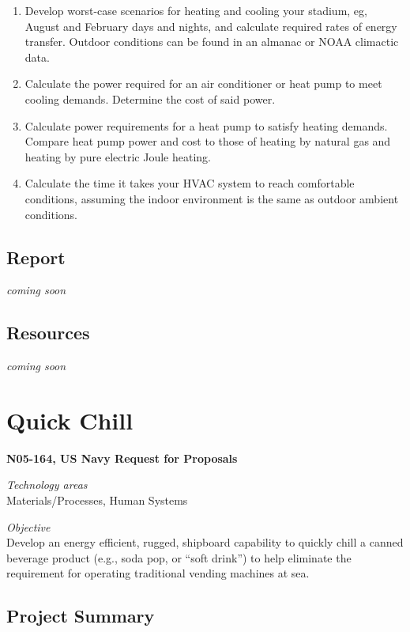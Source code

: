 \documentclass[]{tufte-book}
\providecommand{\tightlist}{%
  \setlength{\itemsep}{0pt}\setlength{\parskip}{0pt}}
\begin{document}
\begin{enumerate}
\def\labelenumi{\arabic{enumi}.}
\tightlist
\item
  Develop worst-case scenarios for heating and cooling your stadium, eg, August and February days and nights, and calculate required rates of energy transfer. Outdoor conditions can be found in an almanac or NOAA climactic data.
\item
  Calculate the power required for an air conditioner or heat pump to meet cooling demands. Determine the cost of said power.
\item
  Calculate power requirements for a heat pump to satisfy heating demands. Compare heat pump power and cost to those of heating by natural gas and heating by pure electric Joule heating.
\item
  Calculate the time it takes your HVAC system to reach comfortable conditions, assuming the indoor environment is the same as outdoor ambient conditions.
\end{enumerate}

\hypertarget{report}{%
\section{Report}\label{report}}

\emph{coming soon}

\hypertarget{resources}{%
\section{Resources}\label{resources}}

\emph{coming soon}

\hypertarget{quick-chill}{%
\chapter{Quick Chill}\label{quick-chill}}

\textbf{N05-164, US Navy Request for Proposals}

\emph{Technology areas}\\
Materials/Processes, Human Systems

\emph{Objective}\\
Develop an energy efficient, rugged, shipboard capability to quickly chill a canned beverage product (e.g., soda pop, or ``soft drink'') to help eliminate the requirement for operating traditional vending machines at sea.

\hypertarget{project-summary}{%
\section{Project Summary}\label{project-summary}}
\end{document}
